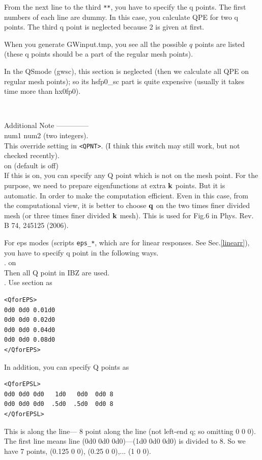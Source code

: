 {From the next line to the third {\tt ***},
you have to specify the q points. 
The first numbers of each line are dummy.
In this case, you calculate QPE for two q points.
The third q point is neglected because 2 is given at first.

When you generate GWinput.tmp, you see all the possible $q$ points 
are listed (these q points should be a part of the regular mesh points).

In the QS\GW mode (gwsc),
this section is neglected (then we calculate all QPE on regular mesh points); 
so its hsfp0\_sc part is quite expensive (usually it takes time more than hx0fp0).

 \

\noindent Additional Note --------------\\

\noindent {} num1 num2 (two integers).\\
This override setting in \verb#<QPNT>#. 
(I think this switch may still work, but not checked recently).\\

\noindent {} on (default is off)\\
If this is on, you can specify any Q point which is not on the mesh point.
For the purpose, we need to prepare eigenfunctions at extra $\bf k$ points.
But it is automatic. In order to make the computation efficient.
Even in this case, from the computational view, it is better to choose
${\bf q}$ on the two times finer divided mesh (or three times finer divided ${\bf k}$ mesh).
This is used for Fig.6 in Phys. Rev. B 74, 245125 (2006).

\newpage
{} 
For eps modes (scripts \verb#eps_*#, which are for linear responses. 
See Sec.\ref{linearr}),
you have to specify q point in the following ways.\\

.  on\\
Then all Q point in IBZ are used.\\

. Use section as
\begin{verbatim}
<QforEPS>
0d0 0d0 0.01d0
0d0 0d0 0.02d0
0d0 0d0 0.04d0
0d0 0d0 0.08d0
</QforEPS>
\end{verbatim}
In addition, you can specify Q points as
\begin{verbatim}
<QforEPSL>
0d0 0d0 0d0   1d0   0d0  0d0 8
0d0 0d0 0d0  .5d0  .5d0  0d0 8
</QforEPSL>
\end{verbatim}
This is along the line--- 8 point along the line (not left-end q; so omitting 0 0 0).
The first line means line (0d0 0d0 0d0)---(1d0 0d0 0d0) is divided to 8. 
So we have 7 points, (0.125 0 0), (0.25 0 0),... (1 0 0).



}
